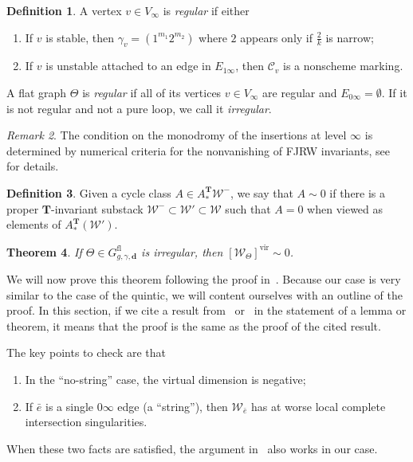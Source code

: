 \documentclass{amsart}
\newtheorem{thm}{Theorem}[section]
\theoremstyle{definition}
\newtheorem{defn}[thm]{Definition}
\theoremstyle{remark}
\newtheorem{rmk}[thm]{Remark}
\theoremstyle{plain}
\theoremstyle{definition}
\theoremstyle{remark}
\newcommand{\T}{\mathbf{T}}
\newcommand{\mc}[1]{\mathcal{#1}}
\newcommand{\mbf}[1]{\mathbf{#1}}
\newcommand{\mr}[1]{\mathrm{#1}}
\newcommand{\1}{\mathbf{1}}
\newcommand{\2}{\mathbf{2}}
\newcommand{\3}{\mathbf{3}}
\newcommand{\vir}{\mr{vir}}
\begin{document}
\begin{defn}
  A vertex $v \in V_{\infty}$ is \textit{regular} if either
  \begin{enumerate}
    \item If $v$ is stable, then $\gamma_v = (1^{m_1}2^{m_2})$ where $2$ appears only if $\frac{2}{k}$ is narrow;
    \item If $v$ is unstable attached to an edge in $E_{1\infty}$, then $\mc{C}_v$ is a nonscheme marking.
  \end{enumerate}
  A flat graph $\Theta$ is \textit{regular} if all of its vertices $v \in V_{\infty}$ are regular and $E_{0\infty} = \emptyset$. If it is not regular and not a pure loop, we call it \textit{irregular}.
\end{defn}

\begin{rmk}
    The condition on the monodromy of the insertions at level $\infty$ is determined by numerical criteria for the nonvanishing of FJRW invariants, see~\cite{fjrw} for details.
\end{rmk}


\begin{defn}
    Given a cycle class $A \in A_*^{\T} \mc{W}^-$, we say that $A \sim 0$ if there is a proper $\T$-invariant substack $\mc{W}^- \subset \mc{W}' \subset \mc{W}$ such that $A = 0$ when viewed as elements of $A_*^{\T}(\mc{W}')$.
\end{defn}


\begin{thm}\label{thm:irrvan}
  If $\Theta \in G_{g,\gamma,\mbf{d}}^{\mr{fl}}$ is irregular, then $[\mc{W}_{\Theta}]^{\vir} \sim 0$.
\end{thm}

We will now prove this theorem following the proof in~\cite[\S 5]{nmsp}. Because our case is very similar to the case of the quintic, we will content ourselves with an outline of the proof. In this section, if we cite a result from~\cite{msp3} or~\cite{nmsp} in the statement of a lemma or theorem, it means that the proof is the same as the proof of the cited result. 

The key points to check are that
\begin{enumerate}
  \item In the ``no-string'' case, the virtual dimension is negative;
  \item If $\bar{e}$ is a single $0\infty$ edge (a ``string''), then $\mc{W}_{\bar{e}}$ has at worse local complete intersection singularities.
\end{enumerate}
When these two facts are satisfied, the argument in~\cite{nmsp} also works in our case.
\end{document}
